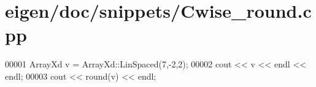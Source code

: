 \hypertarget{eigen_2doc_2snippets_2_cwise__round_8cpp_source}{}\section{eigen/doc/snippets/\+Cwise\+\_\+round.cpp}
\label{eigen_2doc_2snippets_2_cwise__round_8cpp_source}

\begin{DoxyCode}
00001 ArrayXd v = ArrayXd::LinSpaced(7,-2,2);
00002 cout << v << endl << endl;
00003 cout << round(v) << endl;
\end{DoxyCode}
